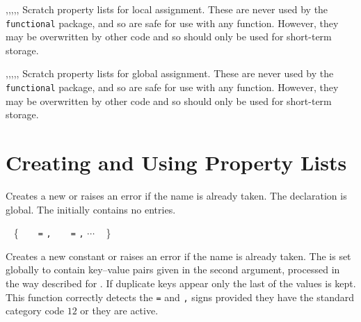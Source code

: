 \documentclass[oneside]{book}
\begin{document}
\begin{variable}{\lTmpaProp,\lTmpbProp,\lTmpcProp,\lTmpiProp,\lTmpjProp,\lTmpkProp}
Scratch property lists for local assignment. These are never used by
the \verb!functional! package, and so are safe for use with any
function. However, they may be overwritten by other
code and so should only be used for short-term storage.
\end{variable}

\begin{variable}{\gTmpaProp,\gTmpbProp,\gTmpcProp,\gTmpiProp,\gTmpjProp,\gTmpkProp}
Scratch property lists for global assignment. These are never used by
the \verb!functional! package, and so are safe for use with any
function. However, they may be overwritten by other
code and so should only be used for short-term storage.
\end{variable}

\section{Creating and Using Property Lists}

\begin{function}{\propNew}
\begin{syntax}
 
\end{syntax}
Creates a new  or raises an error if the name is
already taken. The declaration is global. The 
initially contains no entries.
\begin{codehigh}
\propNew \lFooSomeProp
\end{codehigh}
\end{function}

\begin{function}{\propConstFromKeyval}
\begin{syntax}
 
~ \{
~ ~  \verb|=|  \verb|,|
~ ~  \verb|=|  \verb|,| $\cdots$
~ \}
\end{syntax}
Creates a new constant  or raises an error if the
name is already taken. The  is set globally to
contain key--value pairs given in the second argument, processed in
the way described for .  If duplicate
keys appear only the last of the values is kept.
This function correctly detects the \verb|=| and \verb|,| signs provided they
have the standard category code $12$ or they are active.
\begin{codehigh}
\propConstFromKeyval {}
\end{codehigh}
\end{function}
\end{document}

